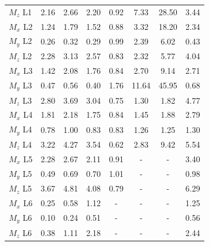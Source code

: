 \begin{table}[h]
\begin{tabular}{lccccccc}
$M_z$ L1 & 2.16 & 2.66 & 2.20 & 0.92 & 7.33 & 28.50 & 3.44 \\
$M_x$ L2 & 1.24 & 1.79 & 1.52 & 0.88 & 3.32 & 18.20 & 2.34 \\
$M_y$ L2 & 0.26 & 0.32 & 0.29 & 0.99 & 2.39 & 6.02 & 0.43 \\
$M_z$ L2 & 2.28 & 3.13 & 2.57 & 0.83 & 2.32 & 5.77 & 4.04 \\
$M_x$ L3 & 1.42 & 2.08 & 1.76 & 0.84 & 2.70 & 9.14 & 2.71 \\
$M_y$ L3 & 0.47 & 0.56 & 0.40 & 1.76 & 11.64 & 45.95 & 0.68 \\
$M_z$ L3 & 2.80 & 3.69 & 3.04 & 0.75 & 1.30 & 1.82 & 4.77 \\
$M_x$ L4 & 1.81 & 2.18 & 1.75 & 0.84 & 1.45 & 1.88 & 2.79 \\
$M_y$ L4 & 0.78 & 1.00 & 0.83 & 0.83 & 1.26 & 1.25 & 1.30 \\
$M_z$ L4 & 3.22 & 4.27 & 3.54 & 0.62 & 2.83 & 9.42 & 5.54 \\
$M_x$ L5 & 2.28 & 2.67 & 2.11 & 0.91 & - & - & 3.40 \\
$M_y$ L5 & 0.49 & 0.69 & 0.70 & 1.01 & - & - & 0.98 \\
$M_z$ L5 & 3.67 & 4.81 & 4.08 & 0.79 & - & - & 6.29 \\
$M_x$ L6 & 0.25 & 0.58 & 1.12 & - & - & - & 1.25 \\
$M_y$ L6 & 0.10 & 0.24 & 0.51 & - & - & - & 0.56 \\
$M_z$ L6 & 0.38 & 1.11 & 2.18 & - & - & - & 2.44 \\
\bottomrule
\end{tabular}
\end{table}
